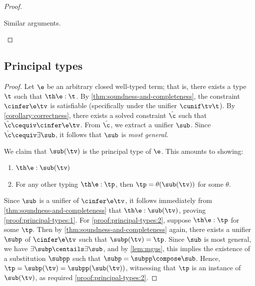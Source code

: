 \documentclass[acmsmall,screen,nonacm%
\Anonymous{,anonymous}{}%
\Final{}{,review}%
]{acmart}
\begin{document}
\begin{theorem}
\begin{proof}
\begin{proofcases}
\begin{proofcases}
\begin{proofcases}
      \proofcase{$\epoly \e$, $\einst \e$, $\erecord {\overline{\elab = \e}}$, $\efield \e \elab$}

	    \begin{llproof}
	      Similar arguments.
	    \end{llproof}
	  \end{proofcases}
	\end{proofcases}
    \end{proofcases}
  \end{proof}
\end{theorem}

\subsection{Principal types}

\principalTypesBIS*
\begin{proof}

Let $\e$ be an arbitrary closed well-typed term; that is, there exists a type
  $\t$ such that $\th \e : \t$.
  By \cref{thm:soundness-and-completeness}, the constraint $\cinfer \e \tv$ is satisfiable
  (specifically under the unifier $\cunif \tv \t$). By \cref{corollary:correctness}, there
  exists a solved constraint $\hat\c$ such that $\hat\c \cequiv \cinfer \e \tv$.
  From $\hat\c$, we extract a unifier $\sub$. Since $\hat\c \cequiv \exists \sub$,
  it follows that $\sub$ is \emph{most general}.

  We claim that $\sub(\tv)$ is the principal type of $\e$. This amounts to showing:
  \begin{enumerate}[(\roman*)]
    \item
      \label{proof:principal-types:1}
      $\th \e : \sub(\tv)$
    \item
      \label{proof:principal-types:2}
      For any other typing $\th \e : \tp$, then $\tp = \theta(\sub(\tv))$ for some $\theta$.
  \end{enumerate}
  Since $\sub$ is a unifier of $\cinfer \e \tv$, it follows immediately from
  \cref{thm:soundness-and-completeness} that $\th \e : \sub(\tv)$, proving \ref{proof:principal-types:1}.
  For \ref{proof:principal-types:2}, suppose $\th \e : \tp$ for some $\tp$. Then by
  \cref{thm:soundness-and-completeness} again, there exists a unifier $\subp$ of $\cinfer \e \tv$
  such that $\subp(\tv) = \tp$. Since $\sub$ is most general, we have $\exists \subp \centails \exists \sub$,
  and by \cref{lem:mgus}, this implies the existence of a substitution $\subpp$ such that
  $\subp = \subpp \compose \sub$.
  Hence, $\tp = \subp(\tv) = \subpp(\sub(\tv))$, witnessing that $\tp$ is an instance of $\sub(\tv)$, as
  required \ref{proof:principal-types:2}.
\end{proof}



\clearpage
\setcounter{tocdepth}{1}
\tableofcontents
\end{document}
